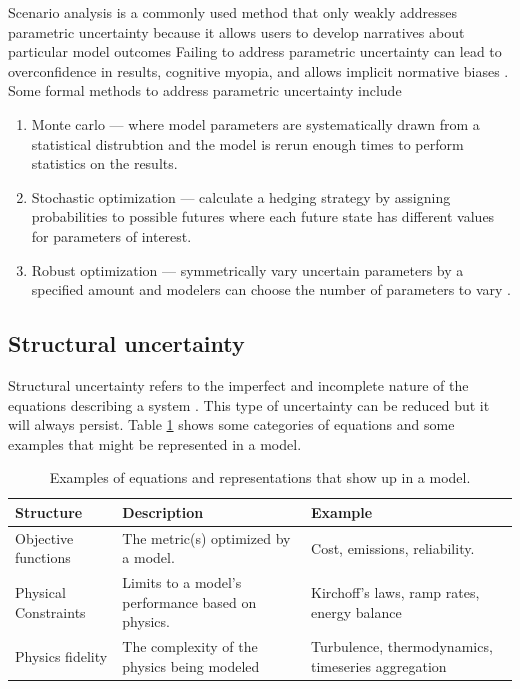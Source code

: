 Scenario analysis is a commonly used method that only weakly addresses
parametric uncertainty because it allows users to develop narratives about
particular model outcomes \cite{decarolis_using_2011} Failing to address
parametric uncertainty can lead to overconfidence in results, cognitive myopia,
and allows implicit normative biases \cite{yue_review_2018}. Some formal methods
to address parametric uncertainty include \cite{yue_review_2018}
\begin{enumerate}
    \item Monte carlo --- where model parameters are systematically drawn from a
    statistical distrubtion and the model is rerun enough times to perform
    statistics on the results.
    \item Stochastic optimization --- calculate a hedging strategy by assigning
    probabilities to possible futures where each future state has different
    values for parameters of interest.
    \item Robust optimization --- symmetrically vary uncertain parameters by a
    specified amount and modelers can choose the number of parameters to vary
    \cite{bertsimas_theory_2011,yue_review_2018}.
\end{enumerate}

\subsection{Structural uncertainty}
Structural uncertainty refers to the imperfect and incomplete nature of the
equations describing a system \cite{decarolis_using_2011}. This type of
uncertainty can be reduced but it will always persist. Table
\ref{tab:structural-examples} shows some categories of equations and some
examples that might be represented in a model.

\begin{table}[ht!]
    \centering
    \caption{Examples of equations and representations that show up in a model.}
    \label{tab:structural-examples}
    \begin{tabularx}{\columnwidth}{ll X}
        \toprule
        Structure&Description&Example\\
        \midrule
        Objective functions& The metric(s) optimized by a model. & Cost,
        emissions, reliability.\\
        Physical Constraints & Limits to a model's performance based on physics.
        & Kirchoff's laws, ramp rates, energy balance \\
        Physics fidelity& The complexity of the physics being modeled &
        Turbulence, thermodynamics, timeseries aggregation\\
        \bottomrule
    \end{tabularx}
\end{table}

